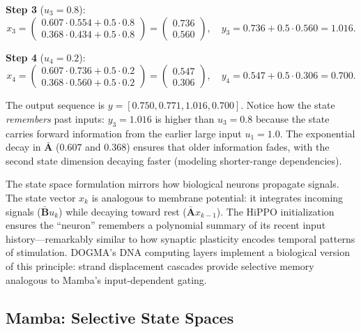 \begin{example}
\textbf{Step 3} ($u_3 = 0.8$):
\[
x_3 = \begin{pmatrix}0.607 \cdot 0.554 + 0.5 \cdot 0.8\\0.368 \cdot 0.434 + 0.5 \cdot 0.8\end{pmatrix} = \begin{pmatrix}0.736\\0.560\end{pmatrix}, \quad y_3 = 0.736 + 0.5 \cdot 0.560 = \mathbf{1.016}.
\]

\textbf{Step 4} ($u_4 = 0.2$):
\[
x_4 = \begin{pmatrix}0.607 \cdot 0.736 + 0.5 \cdot 0.2\\0.368 \cdot 0.560 + 0.5 \cdot 0.2\end{pmatrix} = \begin{pmatrix}0.547\\0.306\end{pmatrix}, \quad y_4 = 0.547 + 0.5 \cdot 0.306 = \mathbf{0.700}.
\]

The output sequence is $y = [0.750, 0.771, 1.016, 0.700]$. Notice how the state \emph{remembers} past inputs: $y_3 = 1.016$ is higher than $u_3 = 0.8$ because the state carries forward information from the earlier large input $u_1 = 1.0$. The exponential decay in $\bar{\mathbf{A}}$ ($0.607$ and $0.368$) ensures that older information fades, with the second state dimension decaying faster (modeling shorter-range dependencies).
\end{example}

\begin{bioinsight}
The state space formulation mirrors how biological neurons propagate signals. The state vector $x_k$ is analogous to membrane potential: it integrates incoming signals ($\bar{\mathbf{B}} u_k$) while decaying toward rest ($\bar{\mathbf{A}} x_{k-1}$). The HiPPO initialization ensures the ``neuron'' remembers a polynomial summary of its recent input history---remarkably similar to how synaptic plasticity encodes temporal patterns of stimulation. DOGMA's DNA computing layers implement a biological version of this principle: strand displacement cascades provide selective memory analogous to Mamba's input-dependent gating.
\end{bioinsight}

\subsection{Mamba: Selective State Spaces}
\label{sec:mamba}

